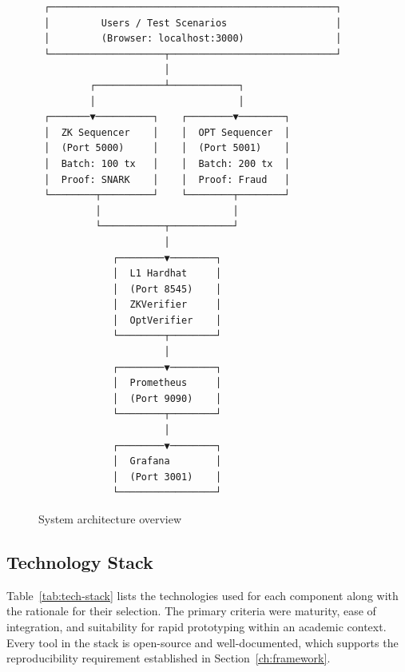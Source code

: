 \documentclass[
]{elteikthesis}[2024/04/26]
\begin{document}
\begin{figure}[h]
    \centering
    \begin{verbatim}
 ┌──────────────────────────────────────────────────┐
 │         Users / Test Scenarios                   │
 │         (Browser: localhost:3000)                │
 └────────────────────┬─────────────────────────────┘
                      │
         ┌────────────┴────────────┐
         │                         │
 ┌───────▼──────────┐    ┌────────▼────────┐
 │  ZK Sequencer    │    │  OPT Sequencer  │
 │  (Port 5000)     │    │  (Port 5001)    │
 │  Batch: 100 tx   │    │  Batch: 200 tx  │
 │  Proof: SNARK    │    │  Proof: Fraud   │
 └────────┬─────────┘    └────────┬────────┘
          │                       │
          └───────────┬───────────┘
                      │
             ┌────────▼────────┐
             │  L1 Hardhat     │
             │  (Port 8545)    │
             │  ZKVerifier     │
             │  OptVerifier    │
             └────────┬────────┘
                      │
             ┌────────▼────────┐
             │  Prometheus     │
             │  (Port 9090)    │
             └────────┬────────┘
                      │
             ┌────────▼────────┐
             │  Grafana        │
             │  (Port 3001)    │
             └─────────────────┘
    \end{verbatim}
    \caption{System architecture overview}
    \label{fig:architecture}
\end{figure}

\subsection{Technology Stack}

Table~\ref{tab:tech-stack} lists the technologies used for each component along with the rationale for their selection. The primary criteria were maturity, ease of integration, and suitability for rapid prototyping within an academic context. Every tool in the stack is open-source and well-documented, which supports the reproducibility requirement established in Section~\ref{ch:framework}.
\end{document}
